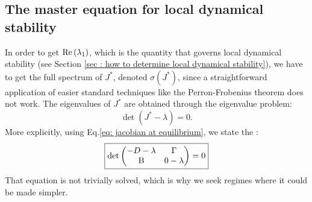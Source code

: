\documentclass[12pt, titlepage]{report}
\begin{document}
\subsection{The master equation for local dynamical stability}\label{sec : establish master equation for dynamical stability}
In order to get $\text{Re}\left(\lambda_1\right)$, which is the quantity that governs local dynamical stability (see Section \ref{sec : how to determine local dynamical stability}), we have to get the full spectrum of $J^*$, denoted $\sigma(J^*)$, since a straightforward application of easier standard techniques like the Perron-Frobenius theorem \cite{perron_zur_1907} does not work. The eigenvalues of $J^*$ are obtained through the eigenvalue problem:
\begin{equation}
\det\left(J^* - \lambda \right) = 0.
\end{equation}
More explicitly, using Eq.\eqref{eq: jacobian at equilibrium}, we state the :
\begin{equation}
\boxed{
\det
\begin{pmatrix}
 -D - \lambda  & \Gamma \\
 \text{B} & 0-\lambda
\end{pmatrix} = 0
}
\end{equation}
That equation is not trivially solved, which is why we seek regimes where it could be made simpler.
\end{document}
